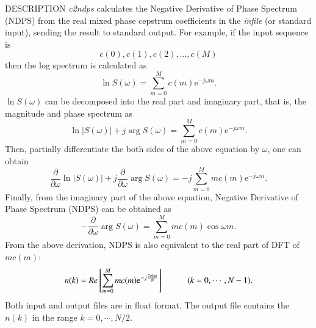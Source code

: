 \begin{synopsis}
 \item[c2ndps] [ --l $L$ ] [ --m $M$ ] [ --p ] [ --z ] [ {\em infile} ]
\end{synopsis}

\begin{qsection}{DESCRIPTION}
{\em c2ndps} calculates the Negative Derivative of Phase Spectrum (NDPS)
from the real mixed phase cepstrum coefficients in the {\em infile} (or standard input),
sending the result to standard output.
For example, if the input sequence is
\begin{displaymath}
   c(0),c(1),c(2),\dots,c(M)
\end{displaymath}
then the log spectrum is calculated as
\begin{displaymath}
\ln S(\omega) = \sum^{M}_{m=0}c(m)\mathrm{e}^{-j\omega m}.
\end{displaymath}
$\ln S(\omega)$ can be decomposed into the real part and imaginary part, that is, the magnitude and phase spectrum as
\begin{displaymath}
 \ln |S(\omega)| + j\arg S(\omega) = \sum^{M}_{m=0}c(m)\mathrm{e}^{-j\omega m}.
\end{displaymath}
 Then, partially differentiate the both sides of the above equation by $\omega$, one can obtain
\begin{displaymath}
 \frac{\partial}{\partial \omega}\ln |S(\omega)| + j\frac{\partial}{\partial \omega}\arg S(\omega) = -j \sum^{M}_{m=0}mc(m)\mathrm{e}^{-j\omega m}.
\end{displaymath}
 Finally, from the imaginary part of the above equation, Negative Derivative of Phase Spectrum (NDPS) can be obtained as
\begin{displaymath}
 -\frac{\partial}{\partial \omega}\arg S(\omega) = \sum^{M}_{m=0}mc(m)\cos \omega m.
\end{displaymath}
 From the above derivation, NDPS is also equivalent to the real part of DFT of $mc(m)$:
\begin{displaymath}
 n(k) = Re\left[ \sum^{M}_{m=0}mc(m)\mathrm{e}^{-j\frac{2\pi km}{N}} \right]\hspace{10mm} (k=0,\cdots,N-1).
\end{displaymath}
Both input and output files are in float format. The output file contains the $n(k)$ in the range $k=0,\cdots,N/2$.


\end{qsection}
